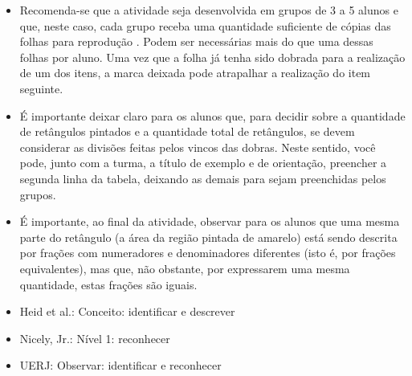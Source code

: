 \begin{multicols}{2}
\begin{itemize} %
    \item       Recomenda-se que a atividade seja desenvolvida em grupos de 3 a
5 alunos e que, neste caso, cada grupo receba uma quantidade suficiente de
cópias das             folhas para reprodução      . Podem ser necessárias mais
do que uma dessas folhas por aluno. Uma vez que a folha já tenha sido dobrada
para a realização de um dos itens, a marca deixada pode atrapalhar a realização
do item seguinte.
    \item       É importante deixar claro para os alunos que, para decidir sobre
a quantidade de retângulos pintados e a quantidade total de retângulos, se devem
considerar as divisões feitas pelos vincos das dobras. Neste sentido, você pode,
junto com a turma, a título de exemplo e de orientação, preencher a segunda
linha da tabela, deixando as demais para sejam preenchidas pelos grupos.
    \item       É importante, ao final da atividade, observar para os alunos que
uma mesma parte do retângulo (a área da região pintada de amarelo) está sendo
descrita por frações com numeradores e denominadores diferentes (isto é, por
frações equivalentes), mas que, não obstante, por expressarem uma mesma
quantidade, estas frações são iguais.
\end{itemize} %


   \vspace{.1cm}

 \vspace{.1cm}

\begin{itemize} %
    \item       Heid et al.: Conceito: identificar e descrever
    \item       Nicely, Jr.: Nível 1: reconhecer
    \item       UERJ: Observar: identificar e reconhecer
\end{itemize} %

  \end{multicols}
  \pagebreak

